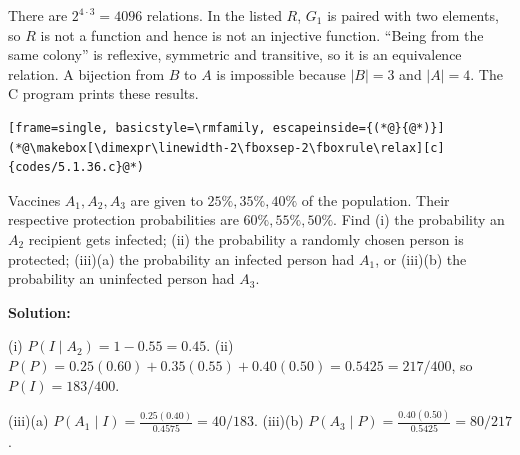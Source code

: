 \documentclass[journal]{IEEEtran}
\begin{document}
\begin{list}{}
There are $2^{4\cdot3}=4096$ relations. In the listed $R$, $G_1$ is paired with two elements, so $R$ is not a function and hence is not an injective function. “Being from the same colony” is reflexive, symmetric and transitive, so it is an equivalence relation. A bijection from $B$ to $A$ is impossible because $|B|=3$ and $|A|=4$. The C program prints these results.
\begin{lstlisting}[frame=single, basicstyle=\rmfamily, escapeinside={(*@}{@*)}]
(*@\makebox[\dimexpr\linewidth-2\fboxsep-2\fboxrule\relax][c]{codes/5.1.36.c}@*)
\end{lstlisting}

\item[5.1.37] Vaccines $A_1,A_2,A_3$ are given to $25\%,35\%,40\%$ of the population. Their respective protection probabilities are $60\%,55\%,50\%$. Find (i) the probability an $A_2$ recipient gets infected; (ii) the probability a randomly chosen person is protected; (iii)(a) the probability an infected person had $A_1$, or (iii)(b) the probability an uninfected person had $A_3$.

\vspace{0.6em}\par\noindent\textbf{Solution:}

(i) $P(I\mid A_2)=1-0.55=0.45$. (ii) $P(P)=0.25(0.60)+0.35(0.55)+0.40(0.50)=0.5425=217/400$, so $P(I)=183/400$.

(iii)(a) $P(A_1\mid I)=\frac{0.25(0.40)}{0.4575}=40/183$. (iii)(b) $P(A_3\mid P)=\frac{0.40(0.50)}{0.5425}=80/217$.
\end{list}
\end{document}
